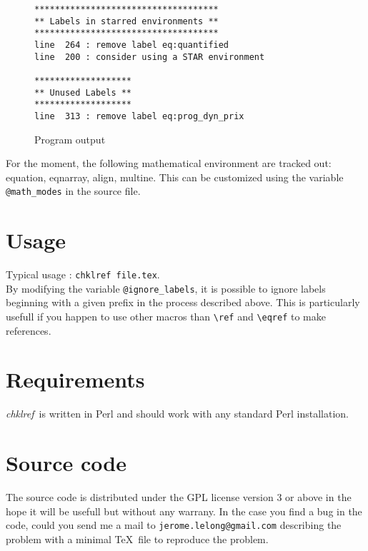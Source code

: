 \documentclass[a4paper,11pt,twoside]{article}
\def\chk{{\it chklref}}
\begin{document}
\begin{figure}[htbp]
  \centering
\begin{verbatim}
************************************
** Labels in starred environments **
************************************
line  264 : remove label eq:quantified
line  200 : consider using a STAR environment

*******************
** Unused Labels **
*******************
line  313 : remove label eq:prog_dyn_prix
\end{verbatim}
  \caption{Program output}
  \label{fig:output}
\end{figure}

For the moment, the following mathematical environment are tracked out:
equation, eqnarray, align, multine. This can be customized using the variable
\verb!@math_modes! in the source file.

\section{Usage}

Typical usage : \verb!chklref file.tex!.
\\

\noindent By modifying the variable \verb!@ignore_labels!, it is possible to ignore labels
beginning with a given prefix in the process described above. This is
particularly usefull if you happen to use other macros than \verb!\ref! and
\verb!\eqref! to make references.

\section{Requirements}

\chk\ is written in Perl and should work with any standard Perl
installation.


\section{Source code}

The source code is distributed under the GPL license version 3 or above in the
hope it will be usefull but without any warrany. In the case you find a bug in
the code, could you send me a mail to \verb!jerome.lelong@gmail.com! describing
the problem with a minimal \TeX\ file to reproduce the problem.
\end{document}
